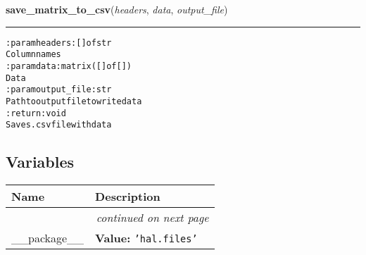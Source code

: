     \label{hal:files:save_as:save_matrix_to_csv}

    \vspace{0.5ex}

\hspace{.8\funcindent}\begin{boxedminipage}{\funcwidth}

    \raggedright \textbf{save\_matrix\_to\_csv}(\textit{headers}, \textit{data}, \textit{output\_file})

    \vspace{-1.5ex}

    \rule{\textwidth}{0.5\fboxrule}
\setlength{\parskip}{2ex}
\begin{alltt}

:param headers: [] of str
    Column names
:param data: matrix ([] of [])
    Data
:param output\_file: str
    Path to output file to write data
:return: void
    Saves .csv file with data
\end{alltt}

\setlength{\parskip}{1ex}
    \end{boxedminipage}



  \subsection{Variables}

    \vspace{-1cm}
\hspace{\varindent}\begin{longtable}{|p{\varnamewidth}|p{\vardescrwidth}|l}
\cline{1-2}
\cline{1-2} \centering \textbf{Name} & \centering \textbf{Description}& \\
\cline{1-2}
\endhead\cline{1-2}\multicolumn{3}{r}{\small\textit{continued on next page}}\\\endfoot\cline{1-2}
\endlastfoot\raggedright \_\-\_\-p\-a\-c\-k\-a\-g\-e\-\_\-\_\- & \raggedright \textbf{Value:} 
{\tt \texttt{'}\texttt{hal.files}\texttt{'}}&\\
\cline{1-2}
\end{longtable}


